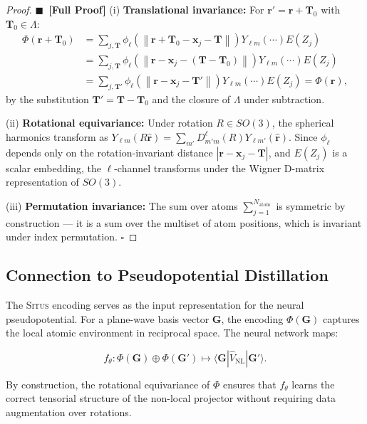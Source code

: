 \documentclass[11pt,a4paper]{article}
\theoremstyle{definition}
\newcommand{\rigorFull}[0]{$\blacksquare$~\textbf{[Full Proof]}}
\newcommand{\Situs}{\textsc{Situs}}
\newcommand{\norm}[1]{\left\lVert#1\right\rVert}
\begin{document}
\begin{proof}\rigorFull
(i) \textbf{Translational invariance:} For $\mathbf{r}' = \mathbf{r} + \mathbf{T}_0$ with $\mathbf{T}_0 \in \Lambda$:
\begin{align}
\Phi(\mathbf{r} + \mathbf{T}_0) &= \sum_{j, \mathbf{T}} \phi_\ell(\norm{\mathbf{r} + \mathbf{T}_0 - \mathbf{x}_j - \mathbf{T}}) Y_{\ell m}(\cdots) E(Z_j) \\
&= \sum_{j, \mathbf{T}} \phi_\ell(\norm{\mathbf{r} - \mathbf{x}_j - (\mathbf{T} - \mathbf{T}_0)}) Y_{\ell m}(\cdots) E(Z_j) \\
&= \sum_{j, \mathbf{T}'} \phi_\ell(\norm{\mathbf{r} - \mathbf{x}_j - \mathbf{T}'}) Y_{\ell m}(\cdots) E(Z_j) = \Phi(\mathbf{r}),
\end{align}
by the substitution $\mathbf{T}' = \mathbf{T} - \mathbf{T}_0$ and the closure of $\Lambda$ under subtraction.

(ii) \textbf{Rotational equivariance:} Under rotation $R \in SO(3)$, the spherical harmonics transform as $Y_{\ell m}(R\hat{\mathbf{r}}) = \sum_{m'} D_{m'm}^{\ell}(R) Y_{\ell m'}(\hat{\mathbf{r}})$. Since $\phi_\ell$ depends only on the rotation-invariant distance $|\mathbf{r} - \mathbf{x}_j - \mathbf{T}|$, and $E(Z_j)$ is a scalar embedding, the $\ell$-channel transforms under the Wigner D-matrix representation of $SO(3)$.

(iii) \textbf{Permutation invariance:} The sum over atoms $\sum_{j=1}^{N_{\mathrm{atom}}}$ is symmetric by construction — it is a sum over the multiset of atom positions, which is invariant under index permutation. $\square$
\end{proof}

\subsection{Connection to Pseudopotential Distillation}

The \Situs{} encoding serves as the input representation for the neural pseudopotential. For a plane-wave basis vector $\mathbf{G}$, the encoding $\Phi(\mathbf{G})$ captures the local atomic environment in reciprocal space. The neural network maps:

\begin{equation}\label{eq:situs_to_vnl}
f_\theta: \Phi(\mathbf{G}) \oplus \Phi(\mathbf{G}') \mapsto \langle \mathbf{G} | \hat{V}_{\mathrm{NL}} | \mathbf{G}' \rangle.
\end{equation}

By construction, the rotational equivariance of $\Phi$ ensures that $f_\theta$ learns the correct tensorial structure of the non-local projector without requiring data augmentation over rotations.
\end{document}
